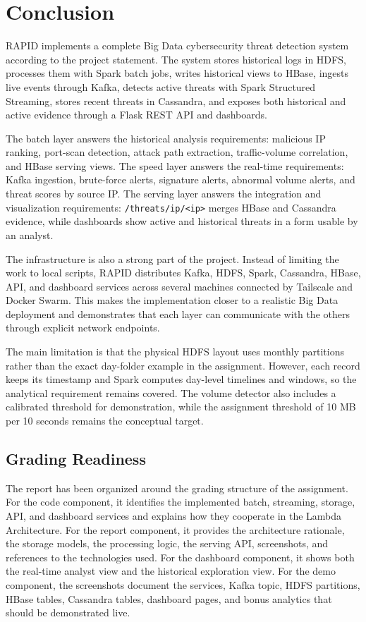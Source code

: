 \section{Conclusion}
\label{sec:conclusion}

RAPID implements a complete Big Data cybersecurity threat detection system according to the project statement. The system stores historical logs in HDFS, processes them with Spark batch jobs, writes historical views to HBase, ingests live events through Kafka, detects active threats with Spark Structured Streaming, stores recent threats in Cassandra, and exposes both historical and active evidence through a Flask REST API and dashboards.

The batch layer answers the historical analysis requirements: malicious IP ranking, port-scan detection, attack path extraction, traffic-volume correlation, and HBase serving views. The speed layer answers the real-time requirements: Kafka ingestion, brute-force alerts, signature alerts, abnormal volume alerts, and threat scores by source IP. The serving layer answers the integration and visualization requirements: \texttt{/threats/ip/<ip>} merges HBase and Cassandra evidence, while dashboards show active and historical threats in a form usable by an analyst.

The infrastructure is also a strong part of the project. Instead of limiting the work to local scripts, RAPID distributes Kafka, HDFS, Spark, Cassandra, HBase, API, and dashboard services across several machines connected by Tailscale and Docker Swarm. This makes the implementation closer to a realistic Big Data deployment and demonstrates that each layer can communicate with the others through explicit network endpoints.

The main limitation is that the physical HDFS layout uses monthly partitions rather than the exact day-folder example in the assignment. However, each record keeps its timestamp and Spark computes day-level timelines and windows, so the analytical requirement remains covered. The volume detector also includes a calibrated threshold for demonstration, while the assignment threshold of 10 MB per 10 seconds remains the conceptual target.

\subsection{Grading Readiness}

The report has been organized around the grading structure of the assignment. For the code component, it identifies the implemented batch, streaming, storage, API, and dashboard services and explains how they cooperate in the Lambda Architecture. For the report component, it provides the architecture rationale, the storage models, the processing logic, the serving API, screenshots, and references to the technologies used. For the dashboard component, it shows both the real-time analyst view and the historical exploration view. For the demo component, the screenshots document the services, Kafka topic, HDFS partitions, HBase tables, Cassandra tables, dashboard pages, and bonus analytics that should be demonstrated live.

